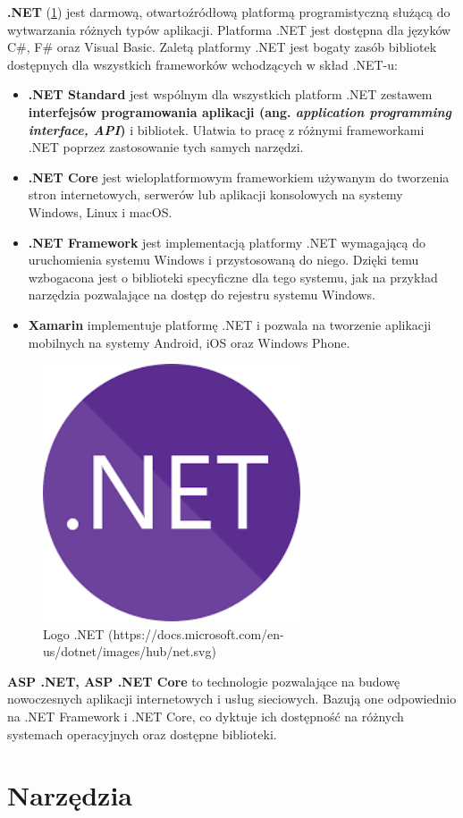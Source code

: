 \textbf{.NET} (\ref{dotnet_logo}) jest darmową, otwartoźródłową platformą programistyczną służącą do wytwarzania różnych typów aplikacji. Platforma .NET jest dostępna dla języków C\#, F\# oraz Visual Basic. Zaletą platformy .NET jest bogaty zasób bibliotek dostępnych dla wszystkich frameworków wchodzących w skład .NET-u\cite{microsoftdotnet}:
\begin{itemize}
	\item\textbf{.NET Standard} jest wspólnym dla wszystkich platform .NET zestawem \textbf{interfejsów programowania aplikacji (ang. \textit{application programming interface, API})} i bibliotek. Ułatwia to pracę z różnymi frameworkami .NET poprzez zastosowanie tych samych narzędzi.
	\item\textbf{.NET Core} jest wieloplatformowym frameworkiem używanym do tworzenia stron internetowych, serwerów lub aplikacji konsolowych na systemy Windows, Linux i macOS.
	\item\textbf{.NET Framework} jest implementacją platformy .NET wymagającą do uruchomienia systemu Windows i przystosowaną do niego. Dzięki temu wzbogacona jest o biblioteki specyficzne dla tego systemu, jak na przykład narzędzia pozwalające na dostęp do rejestru systemu Windows.
	\item\textbf{Xamarin} implementuje platformę .NET i pozwala na tworzenie aplikacji mobilnych na systemy Android, iOS oraz Windows Phone.
\end{itemize}
\begin{figure}[!ht]
\begin{center}
	\includegraphics[width=3in]{img/logo/dotnet.png}
	\caption{Logo .NET (https://docs.microsoft.com/en-us/dotnet/images/hub/net.svg)}
	\label{dotnet_logo}
\end{center}
\end{figure}

\textbf{ASP .NET, ASP .NET Core} to technologie pozwalające na budowę nowoczesnych aplikacji internetowych i usług sieciowych. Bazują one odpowiednio na .NET Framework i .NET Core, co dyktuje ich dostępność na różnych systemach operacyjnych oraz dostępne biblioteki.
\section{Narzędzia}


